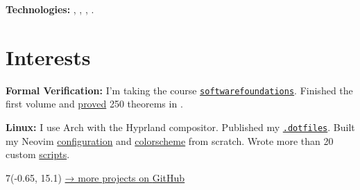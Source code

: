 \documentclass[margin,line]{resume}
\begin{document}
\begin{resume}
\begin{description}
      \textbf{Technologies:}
      ,
      , ,
      .
  \end{description}
  \vspace{-4mm}
  \section{\mysidestyle Interests}\vspace{0.7mm}

  {\textbf{Formal Verification:} I'm taking the course
    \texttt{\href{https://softwarefoundations.cis.upenn.edu}{softwarefoundations}}.
    Finished the first volume and
    \href{https://github.com/alchemmist/coq-learning}{proved} 250
  theorems in .} \\

  \vspace{-6mm}

  \textbf{Linux:} I use Arch with the Hyprland compositor. Published my
  \href{https:/github.com/alchemmist/.dotfiles}{\texttt{.dotfiles}}.
  Built my Neovim
  \href{https://github.com/alchemmist/.dotfiles/tree/main/nvim}{configuration}
  and
  \href{https://github.com/alchemmist/nothing.nvim}{colorscheme} from scratch.
  Wrote more than 20 custom
  \href{https://github.com/alchemmist/.dotfiles/tree/main/scripts}{scripts}.

\end{resume}

\begin{minipage}[H]{9.18\textwidth}
  \begin{textblock}{7}(-0.65, 15.1)
    \begingroup
    \hspace{35mm}
    \hypersetup{urlcolor=gray!90}
    \large
    \href{https://github.com/alchemmist}{→ more projects on
    \underline{GitHub}}
    \endgroup
  \end{textblock}

\end{minipage}

\clearpage
\end{document}
